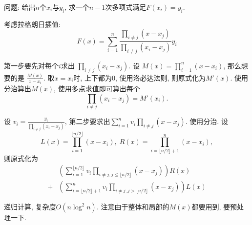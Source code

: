 问题: 给出$n$个$x_i$与$y_i$, 求一个$n-1$次多项式满足$F(x_i)=y_i$.

考虑拉格朗日插值: 
$$F(x)=\sum_{i=1}^n\frac{\prod_{i\neq j}(x-x_j)}{\prod_{i\neq j}(x_i-x_j)}y_i$$

第一步要先对每个$i$求出 $\prod_{i\neq j}(x_i-x_j)$. 设 $M(x)=\prod_{i=1}^{n}(x-x_i)$, 那么想要的是 $\frac{M(x)}{x-x_i}$.  取$x=x_i$时, 上下都为0, 使用洛必达法则, 则原式化为$M'(x)$.  使用分治算出$M(x)$, 使用多点求值即可算出每个
$$\prod_{i\neq j}(x_i-x_j)=M'(x_i).$$

设 $v_i = \frac{y_i}{\prod_{i\neq j}(x_i-x_j)}$, 第二步要求出$\sum_{i=1}^{n}v_i\prod_{i\neq j}(x-x_j)$. 使用分治. 设
$$L(x)=\prod_{i=1}^{\lfloor n/2\rfloor}(x-x_i), \; R(x)=\prod_{i=\lfloor n/2\rfloor+1}^n(x-x_i),$$
则原式化为
\begin{align*}
    &\left( \sum_{i=1}^{\lfloor n/2\rfloor}v_i\prod_{i\neq j,j\leq\lfloor n/2\rfloor}(x-x_j)\right)R(x) \\
    +& \left( \sum_{i=\lfloor n/2\rfloor+1}^{n}v_i\prod_{i\neq j,j>\lfloor n/2\rfloor}(x-x_j)\right)L(x)
\end{align*}

递归计算, 复杂度$O(n\log^2n)$. 注意由于整体和局部的$M(x)$都要用到, 要预处理一下.

\inputminted{cpp}{src/Math/快速插值.cpp}